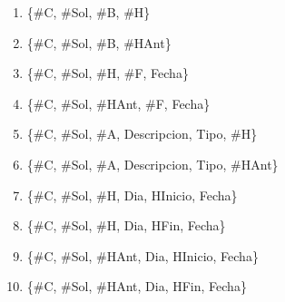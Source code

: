 \begin{enumerate}[label=K\arabic*,leftmargin=3em,itemsep=0pt]
  \item \{\#C, \#Sol, \#B, \#H\}
  \item \{\#C, \#Sol, \#B, \#HAnt\}
  \item \{\#C, \#Sol, \#H, \#F, Fecha\}
  \item \{\#C, \#Sol, \#HAnt, \#F, Fecha\}
  \item \{\#C, \#Sol, \#A, Descripcion, Tipo, \#H\}
  \item \{\#C, \#Sol, \#A, Descripcion, Tipo, \#HAnt\}
  \item \{\#C, \#Sol, \#H, Dia, HInicio, Fecha\}
  \item \{\#C, \#Sol, \#H, Dia, HFin, Fecha\}
  \item \{\#C, \#Sol, \#HAnt, Dia, HInicio, Fecha\}
  \item \{\#C, \#Sol, \#HAnt, Dia, HFin, Fecha\}
\end{enumerate}

